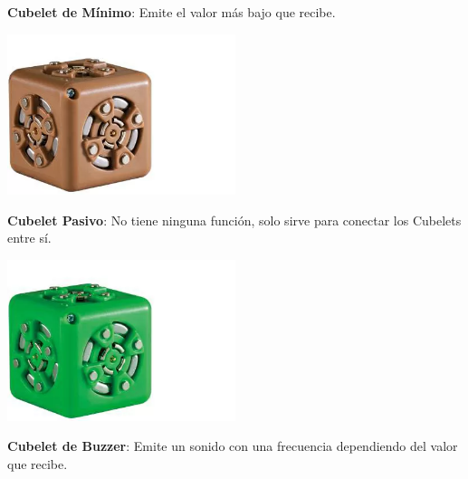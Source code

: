 \begin{itemize}
\begin{minipage}
        \end{minipage}
        \begin{minipage}
            {0.5\textwidth}
            \item \textbf{Cubelet de M\'inimo}: Emite el valor m\'as bajo que recibe.
        \end{minipage}
        \begin{minipage}
            {0.5\textwidth}
            \centering
            \includegraphics[width=0.5\textwidth]{./images/marco_teorico/cubelets/minimo.png}
        \end{minipage}
        \begin{minipage}
            {0.5\textwidth}
            \item \textbf{Cubelet Pasivo}: No tiene ninguna funci\'on, solo sirve para conectar los 
                Cubelets entre s\'i.
        \end{minipage}
        \begin{minipage}
            {0.5\textwidth}
            \centering
            \includegraphics[width=0.5\textwidth]{./images/marco_teorico/cubelets/pasivo.png}
        \end{minipage}
        \begin{minipage}
            {0.5\textwidth}
            \item \textbf{Cubelet de Buzzer}: Emite un sonido con una frecuencia dependiendo del valor
                que recibe.
        \end{minipage}
        \begin{minipage}
            {0.5\textwidth}

\end{minipage}
\end{itemize}
